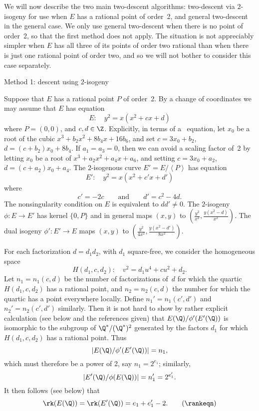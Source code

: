We will now describe the two main two-descent algorithms: two-descent
via $2$-isogeny for use when $E$ has a rational point of order~2, and
general two-descent in the general case.  We only use general
two-descent when there is no point of order~2, so that the first method
does not apply.  The situation is not appreciably simpler when $E$ has
all three of its points of order two rational than when there is just
one rational point of order two, and so we will not bother to consider
this case separately.

\subhead Method 1: descent using $2$-isogeny \endsubhead

Suppose that $E$ has a rational point $P$ of order~2.  By a change of
coordinates we may assume that $E$ has equation
$$
 E: \quad y^2=x(x^2+cx+d)
$$
where $P=(0,0)$, and $c,d\in\Z$.  Explicitly, in terms of a \W\
equation, let $x_0$ be a root of the cubic $x^3+b_2x^2+8b_4x+16b_6$,
and set $c=3x_0+b_2$, $d=(c+b_2)x_0+8b_4$.  If $a_1=a_3=0$, then we
can avoid a scaling factor of~2 by letting $x_0$ be a root of
$x^3+a_2x^2+a_4x+a_6$, and setting $c=3x_0+a_2$, $d=(c+a_2)x_0+a_4$.
The $2$-isogenous curve $E' = E/\left<P\right>$ has equation
$$
   E': \quad y^2=x(x^2+c'x+d')
$$
where 
$$
   c'=-2c  \qquad\text{and}\qquad d'=c^2-4d.
$$
The nonsingularity condition on $E$ is equivalent to $dd'\not=0$.  The
$2$-isogeny $\phi\colon E\to E'$ has kernel $\{0,P\}$ and in general
maps $(x,y)$ to $\left(\frac{y^2}{x^2},\frac{y(x^2-d)}{x^2}\right)$.
The dual isogeny $\phi'\colon E'\to E$ maps $(x,y)$ to
$\left(\frac{y^2}{4x^2},\frac{y(x^2-d')}{8x^2}\right)$.

For each factorization $d=d_1d_2$, with $d_1$ square-free, we consider
the homogeneous space
$$
   H(d_1,c,d_2): \quad  v^2=d_1u^4+cu^2+d_2.
$$
Let $n_1=n_1(c,d)$ be the number of factorizations of~$d$ for which
the quartic $H(d_1,c,d_2)$ has a rational point, and $n_2=n_2(c,d)$
the number for which the quartic has a point everywhere locally.
Define $n_1'=n_1(c',d')$ and $n_2'=n_2(c',d')$ similarly.  Then it is
not hard to show by rather explicit calculation (see below and the
references given) that $E(\Q)/{\phi'}(E'(\Q))$ is isomorphic to the
subgroup of $\Q^*/(\Q^*)^2$ generated by the factors
$d_1$ for which $H(d_1,c,d_2)$ has a rational point.  Thus
$$
     \left|E(\Q)/{\phi'}(E'(\Q))\right| = n_1,
$$
which must therefore be a power of 2, say $n_1=2^{e_1}$; similarly,
$$
     \left|E'(\Q)/\phi(E(\Q))\right| = n_1' = 2^{e_1'}.
$$
It then follows (see below) that\neweq{\rankeqn}
$$
   \rk(E(\Q))=\rk(E'(\Q))= e_1 + e_1' - 2. \tag\rankeqn
$$

